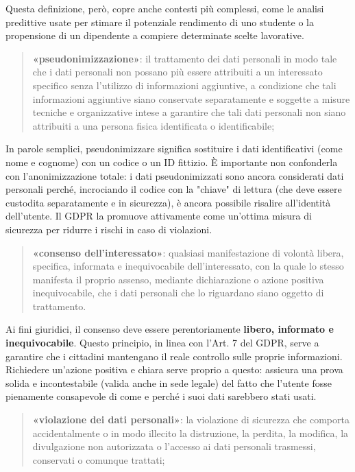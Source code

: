 Questa definizione, però, copre anche contesti più complessi, come le analisi predittive usate per stimare il potenziale rendimento di uno studente o la propensione di un dipendente a compiere determinate scelte lavorative.
\begin{quote}
    \textbf{«pseudonimizzazione»}: il trattamento dei dati personali in modo tale che i dati personali non possano più essere attribuiti a un interessato specifico senza l'utilizzo di informazioni aggiuntive, a condizione che tali informazioni aggiuntive siano conservate separatamente e soggette a misure tecniche e organizzative intese a garantire che tali dati personali non siano attribuiti a una persona fisica identificata o identificabile;
\end{quote}
In parole semplici, pseudonimizzare significa sostituire i dati identificativi (come nome e cognome) con un codice o un ID fittizio.
È importante non confonderla con l'anonimizzazione totale: i dati pseudonimizzati sono ancora considerati dati personali perché, incrociando il codice con la "chiave" di lettura (che deve essere custodita separatamente e in sicurezza), è ancora possibile risalire all'identità dell'utente.
Il GDPR la promuove attivamente come un'ottima misura di sicurezza per ridurre i rischi in caso di violazioni.
\begin{quote}
    \textbf{«consenso dell'interessato»}: qualsiasi manifestazione di volontà libera, specifica, informata e inequivocabile dell'interessato, con la quale lo stesso manifesta il proprio assenso, mediante dichiarazione o azione positiva inequivocabile, che i dati personali che lo riguardano siano oggetto di trattamento.
\end{quote}
Ai fini giuridici, il consenso deve essere perentoriamente \textbf{libero, informato e inequivocabile}. Questo principio, in linea con l'Art. 7 del GDPR, serve a garantire che i cittadini mantengano il reale controllo sulle proprie informazioni.
Richiedere un'azione positiva e chiara serve proprio a questo: assicura una prova solida e incontestabile (valida anche in sede legale) del fatto che l'utente fosse pienamente consapevole di come e perché i suoi dati sarebbero stati usati.
\begin{quote}
    \textbf{«violazione dei dati personali»}: la violazione di sicurezza che comporta accidentalmente o in modo illecito la distruzione, la perdita, la modifica, la divulgazione non autorizzata o l'accesso ai dati personali trasmessi, conservati o comunque trattati;
\end{quote}

